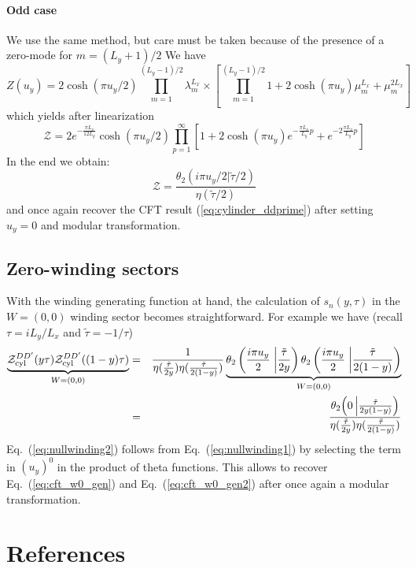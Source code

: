\documentclass[11pt]{iopart}
\begin{document}
\paragraph{Odd case}
We use the same method, but care must be taken because of the presence of a zero-mode for $m=(L_y+1)/2$ We have
\begin{equation}
Z(u_y)=2\cosh(\pi u_y/2)\prod_{m=1}^{(L_y-1)/2} \lambda_m^{L_x}\times \left[\prod_{m=1}^{(L_y-1)/2} 1+2\cosh (\pi u_y)\mu_m^{L_x}+\mu_m^{2L_x}\right] 
\end{equation}
which yields after linearization
\begin{equation}
 \mathcal{Z}= 2 e^{-\frac{\pi L_x}{12 L_y}}\cosh(\pi u_y/2)\prod_{p=1}^{\infty}\left[1+2 \cosh (\pi u_y)e^{-\frac{\pi L_x}{L_y}p}+e^{-2\frac{\pi L_x}{L_y}p}\right]
\end{equation}
In the end we obtain:
\begin{equation}
 \mathcal{Z}=\frac{\theta_2(i \pi u_y/2|\tilde{\tau}/2)}{\eta(\tilde{\tau}/2)}
\end{equation}
and once again recover the CFT result (\ref{eq:cylinder_ddprime}) after setting $u_y=0$ and modular transformation. 
\subsection{Zero-winding sectors}
With the winding generating function at hand, the calculation of $s_n(y,\tau)$ in the $W=(0,0)$ winding sector becomes straightforward. For example we have (recall $\tau=iL_y/L_x$ and $\tilde{\tau}=-1/\tau$)
\begin{eqnarray}\label{eq:nullwinding1}
\underbrace{\mathcal{Z}_{\rm cyl}^{DD^\prime}(y\tau)\mathcal{Z}_{\rm cyl}^{DD^\prime}((1-y)\tau)}_{W=(0,0)}&=&\frac{1}{\eta(\frac{\tilde{\tau}}{2y})\eta(\frac{\tilde{\tau}}{2(1-y)})} 
\underbrace{\theta_2\left(\frac{i \pi u_y}{2}\right.\left|\frac{\tilde{\tau}}{2y}\right)\theta_2\left(\frac{i \pi u_y}{2}\right.\left|\frac{\tilde{\tau}}{2(1-y)}\right)}_{W=(0,0)}\\\label{eq:nullwinding2}
&=&\frac{\theta_2\Big(0\left|\frac{\tilde{\tau}}{2y(1-y)}\right)}{\eta(\frac{\tilde{\tau}}{2y})\eta(\frac{\tilde{\tau}}{2(1-y)})}
\end{eqnarray}
Eq.~(\ref{eq:nullwinding2}) follows from Eq.~(\ref{eq:nullwinding1}) by selecting the term in $(u_y)^0$ in the product of theta functions. This allows to recover Eq.~(\ref{eq:cft_w0_gen}) and Eq.~(\ref{eq:cft_w0_gen2}) after once again a modular transformation. 
 \section*{References}
{}

\end{document}
